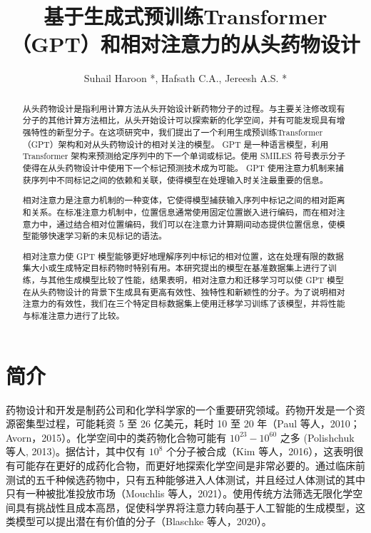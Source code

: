 \begin{translation}
\label{cha:translation}

\title{基于生成式预训练Transformer（GPT）和相对注意力的从头药物设计}
\maketitle

\tableofcontents
\author{Suhail Haroon *, Hafsath C.A., Jereesh A.S. *}

\begin{abstract}

  从头药物设计是指利用计算方法从头开始设计新药物分子的过程。与主要关注修改现有分子的其他计算方法相比，从头开始设计可以探索新的化学空间，并有可能发现具有增强特性的新型分子。在这项研究中，我们提出了一个利用生成预训练Transformer（GPT）架构和对从头药物设计的相对关注的模型。 GPT 是一种语言模型，利用 Transformer 架构来预测给定序列中的下一个单词或标记。使用 SMILES 符号表示分子使得在从头药物设计中使用下一个标记预测技术成为可能。 GPT 使用注意力机制来捕获序列中不同标记之间的依赖和关联，使得模型在处理输入时关注最重要的信息。

  相对注意力是注意力机制的一种变体，它使得模型捕获输入序列中标记之间的相对距离和关系。在标准注意力机制中，位置信息通常使用固定位置嵌入进行编码，而在相对注意力中，通过结合相对位置编码，我们可以在注意力计算期间动态提供位置信息，使模型能够快速学习新的未见标记的语法。

  相对注意力使 GPT 模型能够更好地理解序列中标记的相对位置，这在处理有限的数据集大小或生成特定目标药物时特别有用。本研究提出的模型在基准数据集上进行了训练，与其他生成模型比较了性能，结果表明，相对注意力和迁移学习可以使 GPT 模型在从头药物设计的背景下生成具有更高有效性、独特性和新颖性的分子。为了说明相对注意力的有效性，我们在三个特定目标数据集上使用迁移学习训练了该模型，并将性能与标准注意力进行了比较。
\end{abstract}


\section{简介}

药物设计和开发是制药公司和化学科学家的一个重要研究领域。药物开发是一个资源密集型过程，可能耗资 5 至 26 亿美元，耗时 10 至 20 年（Paul 等人，2010；Avorn，2015）。化学空间中的类药物化合物可能有 $10^{23}-10^{60}$ 之多 (Polishchuk 等人, 2013)。据估计，其中仅有 $10^8$ 个分子被合成（Kim 等人，2016），这表明很有可能存在更好的成药化合物，而更好地探索化学空间是非常必要的。通过临床前测试的五千种候选药物中，只有五种能够进入人体测试，并且经过人体测试的其中只有一种被批准投放市场（Mouchlis 等人，2021）。使用传统方法筛选无限化学空间具有挑战性且成本高昂，促使科学界将注意力转向基于人工智能的生成模型，这类模型可以提出潜在有价值的分子（Blaschke 等人，2020）。


\end{translation}
